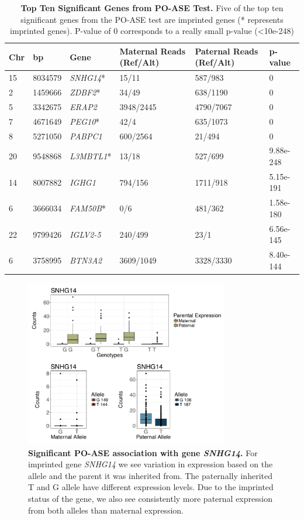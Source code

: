 \begin{table}[!htb]
\centering
\begin{adjustbox}{width={\textwidth}}
\begin{tabular}{@{}p{1cm}p{3cm}p{3cm}p{5cm}p{5cm}p{3cm}@{}}
 \toprule  Chr & bp & Gene & Maternal Reads (Ref/Alt) & Paternal Reads (Ref/Alt) & p-value \\ \midrule
15 & 8034579 & \emph{SNHG14}* & 15/11  & 587/983 & 0 \\
2 & 1459666  & \emph{ZDBF2}* & 34/49  & 638/1190 & 0\\
5 & 3342675 & \emph{ERAP2} & 3948/2445 & 4790/7067 & 0\\
7 & 4671649 &  \emph{PEG10}* & 42/4  & 635/1073 & 0 \\
8 & 5271050 & \emph{PABPC1} & 600/2564 & 21/494 & 0 \\
20 & 9548868 & \emph{L3MBTL1}* & 13/18 & 527/699 & 9.88e-248 \\
14 & 8007882 & \emph{IGHG1} &   794/156  & 1711/918 & 5.15e-191\\
6 & 3666034 & \emph{FAM50B}* & 0/6 & 481/362 & 1.58e-180\\
22 & 9799426 & \emph{IGLV2-5} & 240/499 & 23/1 & 6.56e-145\\
6 & 3758995 & \emph{BTN3A2} & 3609/1049  & 3328/3330 &  8.40e-144\\  \bottomrule
\end{tabular}
\end{adjustbox}
\caption[Top Ten Significant Genes from PO-ASE Test.]{\textbf{Top Ten Significant Genes from PO-ASE Test.} Five of the top ten significant genes from the PO-ASE test are imprinted genes (* represents imprinted genes). P-value of 0 corresponds to a really small p-value (\textless 10e-248)}
\label{tab:poase1}
\end{table}


\begin{figure}[!htb]
\centering \includegraphics[width=3.5in]{img/ch04/SNHG14.pdf}
\caption[Significant PO-ASE association with gene \emph{SNHG14}.]{\textbf{Significant PO-ASE association with gene \emph{SNHG14}.} For imprinted gene \emph{SNHG14} we see variation in expression based on the allele and the parent it was inherited from. The paternally inherited T and G allele have different expression levels. Due to the imprinted status of the gene, we also see consistently more paternal expression from both alleles than maternal expression.}
\label{fig:SNHG14}
\end{figure}

